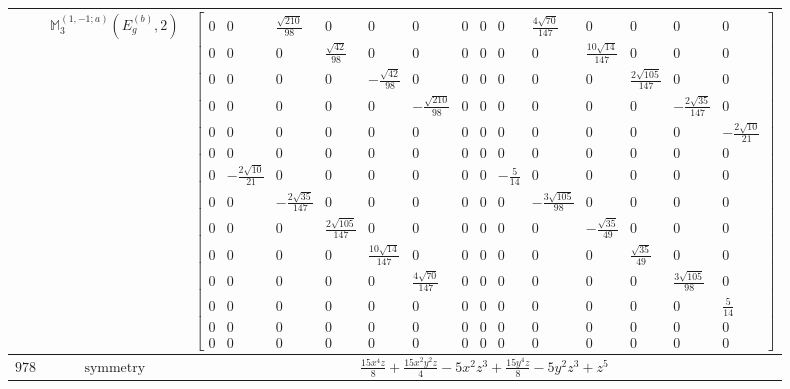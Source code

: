 \documentclass[fleqn,8pt,landscape]{jsarticle}
\begin{document}
\begin{longtable}{ccc}
$  $ & $ \mathbb{M}_{3}^{(1,-1;a)}(E_{g}^{(b)},2) $ & $ \begin{bmatrix} 0 & 0 & \frac{\sqrt{210}}{98} & 0 & 0 & 0 & 0 & 0 & 0 & \frac{4 \sqrt{70}}{147} & 0 & 0 & 0 & 0 \\ 0 & 0 & 0 & \frac{\sqrt{42}}{98} & 0 & 0 & 0 & 0 & 0 & 0 & \frac{10 \sqrt{14}}{147} & 0 & 0 & 0 \\ 0 & 0 & 0 & 0 & - \frac{\sqrt{42}}{98} & 0 & 0 & 0 & 0 & 0 & 0 & \frac{2 \sqrt{105}}{147} & 0 & 0 \\ 0 & 0 & 0 & 0 & 0 & - \frac{\sqrt{210}}{98} & 0 & 0 & 0 & 0 & 0 & 0 & - \frac{2 \sqrt{35}}{147} & 0 \\ 0 & 0 & 0 & 0 & 0 & 0 & 0 & 0 & 0 & 0 & 0 & 0 & 0 & - \frac{2 \sqrt{10}}{21} \\ 0 & 0 & 0 & 0 & 0 & 0 & 0 & 0 & 0 & 0 & 0 & 0 & 0 & 0 \\ 0 & - \frac{2 \sqrt{10}}{21} & 0 & 0 & 0 & 0 & 0 & 0 & - \frac{5}{14} & 0 & 0 & 0 & 0 & 0 \\ 0 & 0 & - \frac{2 \sqrt{35}}{147} & 0 & 0 & 0 & 0 & 0 & 0 & - \frac{3 \sqrt{105}}{98} & 0 & 0 & 0 & 0 \\ 0 & 0 & 0 & \frac{2 \sqrt{105}}{147} & 0 & 0 & 0 & 0 & 0 & 0 & - \frac{\sqrt{35}}{49} & 0 & 0 & 0 \\ 0 & 0 & 0 & 0 & \frac{10 \sqrt{14}}{147} & 0 & 0 & 0 & 0 & 0 & 0 & \frac{\sqrt{35}}{49} & 0 & 0 \\ 0 & 0 & 0 & 0 & 0 & \frac{4 \sqrt{70}}{147} & 0 & 0 & 0 & 0 & 0 & 0 & \frac{3 \sqrt{105}}{98} & 0 \\ 0 & 0 & 0 & 0 & 0 & 0 & 0 & 0 & 0 & 0 & 0 & 0 & 0 & \frac{5}{14} \\ 0 & 0 & 0 & 0 & 0 & 0 & 0 & 0 & 0 & 0 & 0 & 0 & 0 & 0 \\ 0 & 0 & 0 & 0 & 0 & 0 & 0 & 0 & 0 & 0 & 0 & 0 & 0 & 0 \end{bmatrix} $ \\ \hline
$ 978 $ & $ \text{symmetry} $ & $ \frac{15 x^{4} z}{8} + \frac{15 x^{2} y^{2} z}{4} - 5 x^{2} z^{3} + \frac{15 y^{4} z}{8} - 5 y^{2} z^{3} + z^{5} $ \\

\end{longtable}
\end{document}
